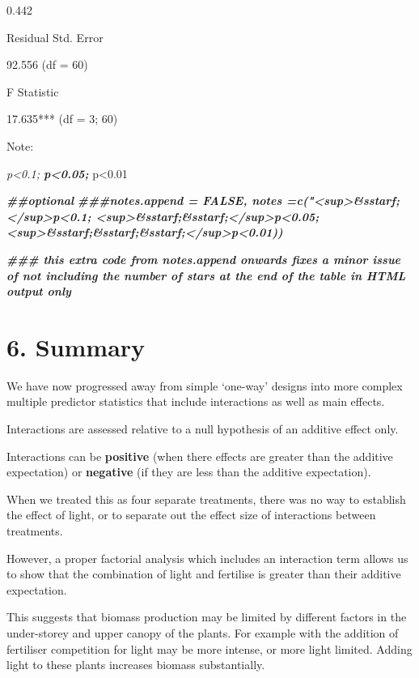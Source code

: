 \documentclass[
]{article}
\newenvironment{Shaded}{\begin{snugshade}}{\end{snugshade}}
\newcommand{\DocumentationTok}[1]{\textcolor[rgb]{0.56,0.35,0.01}{\textbf{\textit{#1}}}}
\begin{document}
0.442

Residual Std. Error

92.556 (df = 60)

F Statistic

17.635*** (df = 3; 60)

Note:

\emph{p\textless0.1; \textbf{p\textless0.05; }}p\textless0.01

\begin{Shaded}
\begin{Highlighting}[]
\DocumentationTok{\#\#optional}
\DocumentationTok{\#\#\#notes.append = FALSE, notes =c("\textless{}sup\textgreater{}\&sstarf;\textless{}/sup\textgreater{}p\textless{}0.1; \textless{}sup\textgreater{}\&sstarf;\&sstarf;\textless{}/sup\textgreater{}p\textless{}0.05; \textless{}sup\textgreater{}\&sstarf;\&sstarf;\&sstarf;\textless{}/sup\textgreater{}p\textless{}0.01))}

\DocumentationTok{\#\#\# this extra code from notes.append onwards fixes a minor issue of not including the number of stars at the end of the table in HTML output only}
\end{Highlighting}
\end{Shaded}

\hypertarget{summary-1}{%
\section{6. Summary}\label{summary-1}}

We have now progressed away from simple `one-way' designs into more
complex multiple predictor statistics that include interactions as well
as main effects.

Interactions are assessed relative to a null hypothesis of an additive
effect only.

Interactions can be \textbf{positive} (when there effects are greater
than the additive expectation) or \textbf{negative} (if they are less
than the additive expectation).

When we treated this as four separate treatments, there was no way to
establish the effect of light, or to separate out the effect size of
interactions between treatments.

However, a proper factorial analysis which includes an interaction term
allows us to show that the combination of light and fertilise is greater
than their additive expectation.

This suggests that biomass production may be limited by different
factors in the under-storey and upper canopy of the plants. For example
with the addition of fertiliser competition for light may be more
intense, or more light limited. Adding light to these plants increases
biomass substantially.
\end{document}
